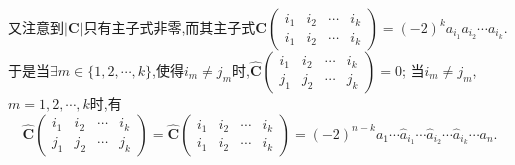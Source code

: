 \documentclass[../../main.tex]{subfiles}%
\begin{document}
\begin{solution}
\begin{enumerate}[(1)]
又注意到\(|\boldsymbol{C}|\)只有主子式非零,而其主子式\(\boldsymbol{C}\left(\begin{matrix}
i_1 & i_2 & \cdots & i_k\\
i_1 & i_2 & \cdots & i_k
\end{matrix}\right) = (-2)^ka_{i_1}a_{i_2}\cdots a_{i_k}\).
于是当\(\exists m\in \{1,2,\cdots,k\}\),使得\(i_m\neq j_m\)时,\(\widehat{\boldsymbol{C}}\left(\begin{matrix}
i_1 & i_2 & \cdots & i_k\\
j_1 & j_2 & \cdots & j_k
\end{matrix}\right) = 0\);
当\(i_m\neq j_m\),\(m = 1,2,\cdots,k\)时,有\[\widehat{\boldsymbol{C}}\left(\begin{matrix}
i_1 & i_2 & \cdots & i_k\\
j_1 & j_2 & \cdots & j_k
\end{matrix}\right) = \widehat{\boldsymbol{C}}\left(\begin{matrix}
i_1 & i_2 & \cdots & i_k\\
i_1 & i_2 & \cdots & i_k
\end{matrix}\right) = (-2)^{n - k}a_1\cdots \hat{a}_{i_1}\cdots \hat{a}_{i_2}\cdots \hat{a}_{i_k}\cdots a_n.\]


\end{enumerate}
\end{solution}
\end{document}
